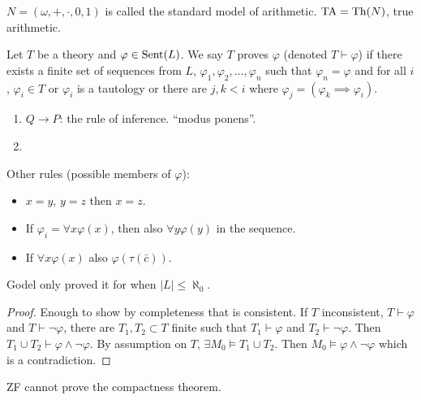 \documentclass{report}
\begin{document}

$N = (\omega, +, \cdot, 0, 1)$ is called the standard model of arithmetic. $\text{TA} = \text{Th}(N)$, true arithmetic. 


Let $T$ be a theory and $\varphi \in \text{Sent}(L)$. We say $T$ proves $\varphi$ (denoted $T \vdash \varphi$) if there exists a finite set of sequences from $L$, $\varphi_1, \varphi_2, \ldots, \varphi_n$ such that $\varphi_n = \varphi$ and for all $i$, $\varphi_i \in T$ or $\varphi_i$ is a tautology or there are $j, k < i$ where $\varphi_j = (\varphi_k \implies \varphi_i)$.

\begin{enumerate}
    \item $Q \to P$: the rule of inference. ``modus ponens''.
    \item 
\end{enumerate}
Other rules (possible members of $\varphi$):
\begin{itemize}
    \item $x = y$, $y  = z$ then $x = z$.
    \item If $\varphi_i = \forall x \varphi(x)$, then also $\forall y \varphi(y)$ in the sequence. 
    \item If $\forall x \varphi (x)$ also $\varphi(\tau(\bar c))$. 
\end{itemize}



Godel only proved it for when $|L| \leq \aleph_0$.

\begin{proof}
    Enough to show by completeness that is consistent. If $T$ inconsistent, $T \vdash \varphi$ and $T \vdash \neg \varphi$, there are $T_1, T_2 \subset T$ finite such that $T_1 \vdash \varphi$ and $T_2 \vdash \neg \varphi$. Then $T_1 \cup T_2 \vdash \varphi \land \neg \varphi$. By assumption on $T$, $\exists M_0 \models T_1 \cup T_2$. Then $M_0 \models \varphi \land \neg \varphi$ which is a contradiction.
\end{proof}
ZF cannot prove the compactness theorem.
\end{document}
